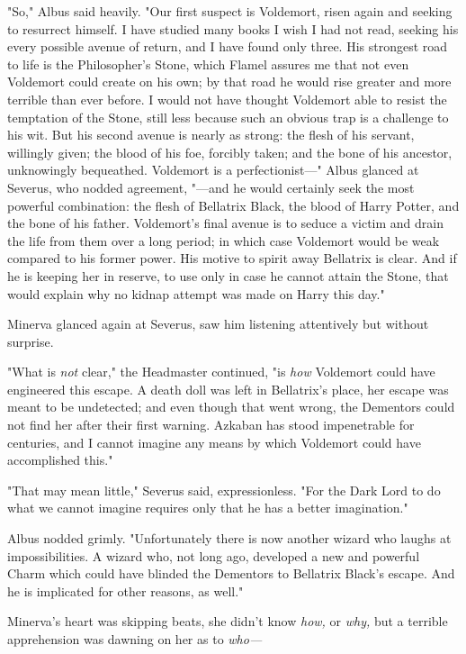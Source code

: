 "So," Albus said heavily. "Our first suspect is Voldemort, risen again and
seeking to resurrect himself. I have studied many books I wish I had not read,
seeking his every possible avenue of return, and I have found only three. His
strongest road to life is the Philosopher's Stone, which Flamel assures me that
not even Voldemort could create on his own; by that road he would rise greater
and more terrible than ever before. I would not have thought Voldemort able to
resist the temptation of the Stone, still less because such an obvious trap is
a challenge to his wit. But his second avenue is nearly as strong: the flesh of
his servant, willingly given; the blood of his foe, forcibly taken; and the
bone of his ancestor, unknowingly bequeathed. Voldemort is a perfectionist---"
Albus glanced at Severus, who nodded agreement, "---and he would certainly seek
the most powerful combination: the flesh of Bellatrix Black, the blood of Harry
Potter, and the bone of his father. Voldemort's final avenue is to seduce a
victim and drain the life from them over a long period; in which case Voldemort
would be weak compared to his former power. His motive to spirit away Bellatrix
is clear. And if he is keeping her in reserve, to use only in case he cannot
attain the Stone, that would explain why no kidnap attempt was made on Harry
this day."

Minerva glanced again at Severus, saw him listening attentively but without
surprise.

"What is \emph{not} clear," the Headmaster continued, "is \emph{how} Voldemort
could have engineered this escape. A death doll was left in Bellatrix's place,
her escape was meant to be undetected; and even though that went wrong, the
Dementors could not find her after their first warning. Azkaban has stood
impenetrable for centuries, and I cannot imagine any means by which Voldemort
could have accomplished this."

"That may mean little," Severus said, expressionless. "For the Dark Lord to do
what we cannot imagine requires only that he has a better imagination."

Albus nodded grimly. "Unfortunately there is now another wizard who laughs at
impossibilities. A wizard who, not long ago, developed a new and powerful Charm
which could have blinded the Dementors to Bellatrix Black's escape. And he is
implicated for other reasons, as well."

Minerva's heart was skipping beats, she didn't know \emph{how,} or \emph{why,}
but a terrible apprehension was dawning on her as to \emph{who---}

